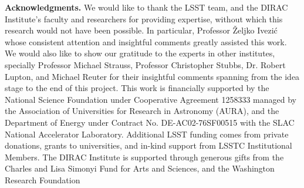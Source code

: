 \documentclass[12pt]{aastex62}
\theoremstyle{definition}
\begin{document}
\acknowledgments
\textbf{Acknowledgments.} We would like to thank the LSST team, and the DIRAC Institute's faculty and researchers for providing expertise, without which this research would not have been possible. In particular, Professor \v{Z}eljko Ivezi\'{c} whose consistent attention and insightful comments greatly assisted this work. We would also like to show our gratitude to the experts in other institutes, specially Professor Michael Strauss, Professor Christopher Stubbs, Dr. Robert Lupton, and Michael Reuter for their insightful comments spanning from the idea stage to the end of this project. This work is financially supported by the National Science Foundation under Cooperative Agreement 1258333 managed by the Association of Universities for Research in Astronomy (AURA), and the Department of Energy under Contract No. DE-AC02-76SF00515 with the SLAC National Accelerator Laboratory. Additional LSST funding comes from private donations, grants to universities, and in-kind support from LSSTC Institutional Members. The DIRAC Institute is supported through generous gifts from the Charles and Lisa Simonyi Fund for Arts and Sciences, and the Washington Research Foundation



%
%

\end{document}
